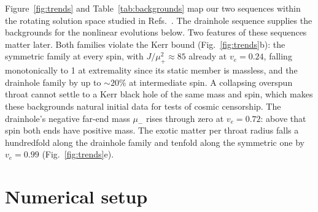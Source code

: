 \documentclass[twocolumn,floatfix,aps,prd,superscriptaddress,nofootinbib]{revtex4-2}
\begin{document}
Figure~\ref{fig:trends} and Table~\ref{tab:backgrounds} map our two sequences within the rotating solution space studied in Refs.~\cite{kleihaus_kunz2014,chew2016}. The drainhole sequence supplies the backgrounds for the nonlinear evolutions below. Two features of these sequences matter later. Both families violate the Kerr bound (Fig.~\ref{fig:trends}b): the symmetric family at every spin, with $J/\mu_+^2\approx85$ already at $v_e=0.24$, falling monotonically to 1 at extremality since its static member is massless, and the drainhole family by up to ${\sim}20\%$ at intermediate spin. A collapsing overspun throat cannot settle to a Kerr black hole of the same mass and spin, which makes these backgrounds natural initial data for tests of cosmic censorship. The drainhole's negative far-end mass $\mu_-$ rises through zero at $v_e=0.72$: above that spin both ends have positive mass. The exotic matter per throat radius falls a hundredfold along the drainhole family and tenfold along the symmetric one by $v_e=0.99$ (Fig.~\ref{fig:trends}e).

\section{Numerical setup}
\label{sec:setup}
\end{document}
